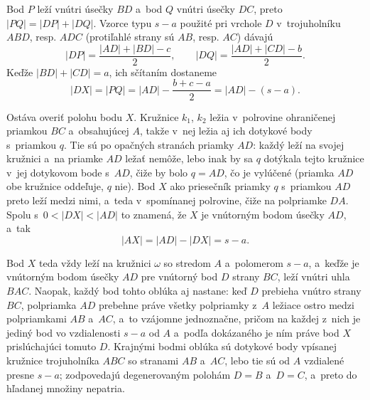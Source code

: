 {    Bod $P$ leží vnútri úsečky $BD$ a~bod $Q$ vnútri úsečky $DC$, preto $|PQ| = |DP| + |DQ|$. Vzorce typu $s - a$ použité pri vrchole $D$ v~trojuholníku $ABD$, resp. $ADC$ (protiľahlé strany sú $AB$, resp. $AC$) dávajú
    $$
    |DP| = \frac{|AD| + |BD| - c}{2}, \qquad |DQ| = \frac{|AD| + |CD| - b}{2}.
    $$
    Keďže $|BD| + |CD| = a$, ich sčítaním dostaneme
    $$
    |DX| = |PQ| = |AD| - \frac{b + c - a}{2} = |AD| - (s - a).
    $$

    Ostáva overiť polohu bodu $X$. Kružnice $k_1$, $k_2$ ležia v~polrovine ohraničenej priamkou $BC$ a~obsahujúcej $A$, takže v~nej ležia aj ich dotykové body s~priamkou $q$. Tie sú po opačných stranách priamky $AD$: každý leží na svojej kružnici a~na priamke $AD$ ležať nemôže, lebo inak by sa $q$ dotýkala tejto kružnice v~jej dotykovom bode s~$AD$, čiže by bolo $q = AD$, čo je vylúčené (priamka $AD$ obe kružnice oddeľuje, $q$ nie). Bod $X$ ako priesečník priamky $q$ s~priamkou $AD$ preto leží medzi nimi, a~teda v~spomínanej polrovine, čiže na polpriamke $DA$. Spolu s~$0 < |DX| < |AD|$ to znamená, že $X$ je vnútorným bodom úsečky $AD$, a~tak
    $$
    |AX| = |AD| - |DX| = s - a.
    $$

    Bod $X$ teda vždy leží na kružnici $\omega$ so stredom $A$ a~polomerom $s - a$, a~keďže je vnútorným bodom úsečky $AD$ pre vnútorný bod $D$ strany $BC$, leží vnútri uhla $BAC$. Naopak, každý bod tohto oblúka aj nastane: keď $D$ prebieha vnútro strany $BC$, polpriamka $AD$ prebehne práve všetky polpriamky z~$A$ ležiace ostro medzi polpriamkami $AB$ a~$AC$, a~to vzájomne jednoznačne, pričom na každej z~nich je jediný bod vo vzdialenosti $s - a$ od $A$ a~podľa dokázaného je ním práve bod $X$ prislúchajúci tomuto $D$. Krajnými bodmi oblúka sú dotykové body vpísanej kružnice trojuholníka $ABC$ so stranami $AB$ a~$AC$, lebo tie sú od $A$ vzdialené presne $s - a$; zodpovedajú degenerovaným polohám $D = B$ a~$D = C$, a~preto do hľadanej množiny nepatria.
}

